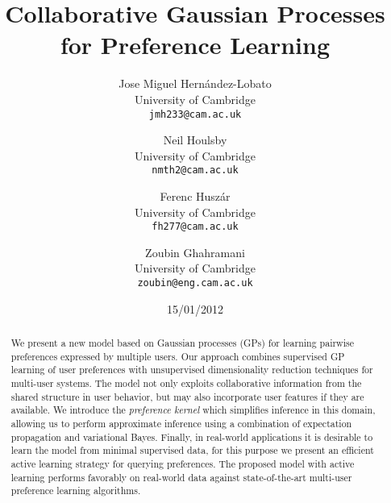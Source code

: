 \documentclass{article}
\begin{document}
\title{Collaborative Gaussian Processes for Preference Learning}

\date{15/01/2012}

\author{Jose Miguel Hern\'{a}ndez-Lobato \\ University of Cambridge \\ \texttt{jmh233@cam.ac.uk} \and Neil Houlsby \\ University of Cambridge  \\ \texttt{nmth2@cam.ac.uk} \and Ferenc Husz\'{a}r \\ University of Cambridge \\ \texttt{fh277@cam.ac.uk} \and Zoubin Ghahramani \\ University of Cambridge \\ \texttt{zoubin@eng.cam.ac.uk}}
\maketitle

\begin{abstract}
We present a new model based on Gaussian processes (GPs) for learning pairwise preferences expressed by multiple users.
Our approach combines supervised GP learning of user preferences with unsupervised dimensionality
reduction techniques for multi-user systems.
The model not only exploits collaborative information from
the shared structure in user behavior, but may also incorporate user features if they are available.
We introduce the \emph{preference kernel} which simplifies inference in this domain,
allowing us to perform approximate inference using a combination of
expectation propagation and variational Bayes.
Finally, in real-world applications it is desirable to learn the model from minimal supervised data, for this purpose we present an efficient active learning strategy for querying preferences.
The proposed model with active learning performs favorably on real-world data against state-of-the-art multi-user preference learning algorithms.
\end{abstract}










{


}

\newpage
\end{document}
